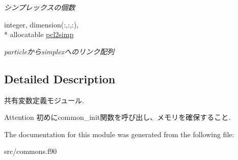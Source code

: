 \begin{DoxyCompactItemize}
\begin{DoxyCompactList}\small\item\em シンプレックスの個数 \end{DoxyCompactList}\item 
\hypertarget{classcommons_ac71ce4258c65cec92a5da30d46d51a99}{integer, dimension(\-:,\-:,\-:), \\*
allocatable \hyperlink{classcommons_ac71ce4258c65cec92a5da30d46d51a99}{pcl2simp}}\label{classcommons_ac71ce4258c65cec92a5da30d46d51a99}

\begin{DoxyCompactList}\small\item\em particleからsimplexへのリンク配列 \end{DoxyCompactList}\end{DoxyCompactItemize}


\subsection{Detailed Description}
共有変数定義モジュール. 

\begin{DoxyAttention}{Attention}
初めにcommon\-\_\-init関数を呼び出し、メモリを確保すること. 
\end{DoxyAttention}


The documentation for this module was generated from the following file\-:\begin{DoxyCompactItemize}
\item 
src/commons.\-f90\end{DoxyCompactItemize}
